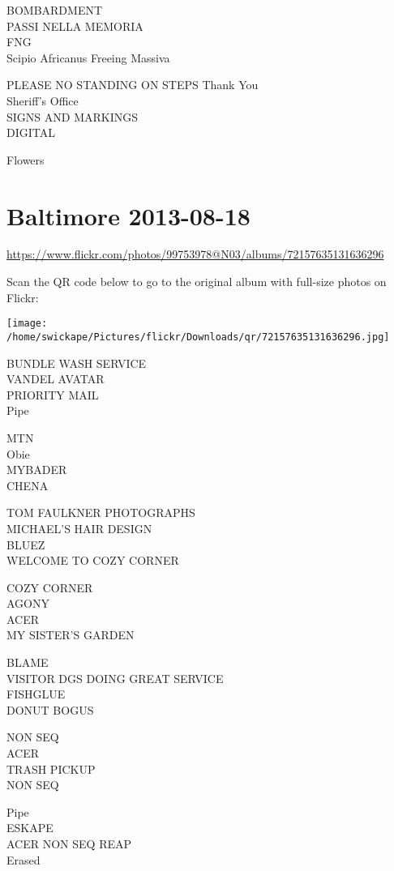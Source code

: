 \documentclass[10pt,letterpaper]{article}
\begin{document}
BOMBARDMENT\\
PASSI NELLA MEMORIA\\
FNG\\
Scipio Africanus Freeing Massiva

PLEASE NO STANDING ON STEPS Thank You\\
Sheriff's Office\\
SIGNS AND MARKINGS\\
DIGITAL

Flowers


\section*{Baltimore 2013-08-18}

\url{https://www.flickr.com/photos/99753978@N03/albums/72157635131636296}

Scan the QR code below to go to the original album with full-size photos on Flickr:

\texttt{[image: /home/swickape/Pictures/flickr/Downloads/qr/72157635131636296.jpg]}


BUNDLE WASH SERVICE\\
VANDEL AVATAR\\
PRIORITY MAIL\\
Pipe

MTN\\
Obie\\
MYBADER\\
CHENA

TOM FAULKNER PHOTOGRAPHS\\
MICHAEL'S HAIR DESIGN\\
BLUEZ\\
WELCOME TO COZY CORNER

COZY CORNER\\
AGONY\\
ACER\\
MY SISTER'S GARDEN

BLAME\\
VISITOR DGS DOING GREAT SERVICE\\
FISHGLUE\\
DONUT BOGUS

NON SEQ\\
ACER\\
TRASH PICKUP\\
NON SEQ

Pipe\\
ESKAPE\\
ACER NON SEQ REAP\\
Erased
\end{document}
